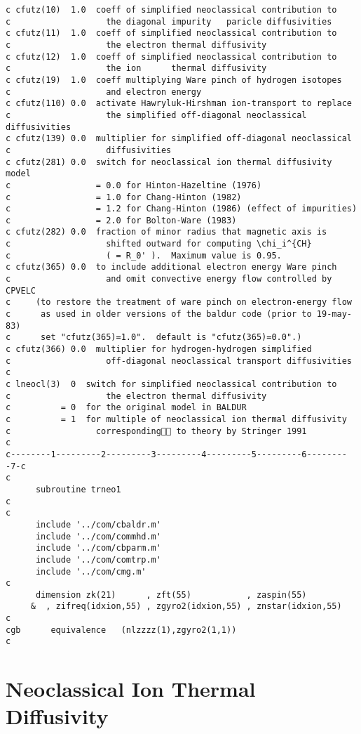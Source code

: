 \begin{verbatim}
c cfutz(10)  1.0  coeff of simplified neoclassical contribution to
c                   the diagonal impurity   paricle diffusivities
c cfutz(11)  1.0  coeff of simplified neoclassical contribution to
c                   the electron thermal diffusivity
c cfutz(12)  1.0  coeff of simplified neoclassical contribution to
c                   the ion      thermal diffusivity
c cfutz(19)  1.0  coeff multiplying Ware pinch of hydrogen isotopes
c                   and electron energy
c cfutz(110) 0.0  activate Hawryluk-Hirshman ion-transport to replace
c                   the simplified off-diagonal neoclassical diffusivities
c cfutz(139) 0.0  multiplier for simplified off-diagonal neoclassical 
c                   diffusivities
c cfutz(281) 0.0  switch for neoclassical ion thermal diffusivity model
c                 = 0.0 for Hinton-Hazeltine (1976)
c                 = 1.0 for Chang-Hinton (1982)
c                 = 1.2 for Chang-Hinton (1986) (effect of impurities)
c                 = 2.0 for Bolton-Ware (1983)
c cfutz(282) 0.0  fraction of minor radius that magnetic axis is 
c                   shifted outward for computing \chi_i^{CH}
c                   ( = R_0' ).  Maximum value is 0.95.
c cfutz(365) 0.0  to include additional electron energy Ware pinch
c                   and omit convective energy flow controlled by CPVELC
c     (to restore the treatment of ware pinch on electron-energy flow
c      as used in older versions of the baldur code (prior to 19-may-83)
c      set "cfutz(365)=1.0".  default is "cfutz(365)=0.0".)
c cfutz(366) 0.0  multiplier for hydrogen-hydrogen simplified
c                   off-diagonal neoclassical transport diffusivities
c
c lneocl(3)  0  switch for simplified neoclassical contribution to
c                   the electron thermal diffusivity
c          = 0  for the original model in BALDUR
c          = 1  for multiple of neoclassical ion thermal diffusivity
c                 corresponding to theory by Stringer 1991 
c
c--------1---------2---------3---------4---------5---------6---------7-c
c
      subroutine trneo1
c
c
      include '../com/cbaldr.m'
      include '../com/commhd.m'
      include '../com/cbparm.m'
      include '../com/comtrp.m'
      include '../com/cmg.m'
c
      dimension zk(21)      , zft(55)           , zaspin(55)
     &  , zifreq(idxion,55) , zgyro2(idxion,55) , znstar(idxion,55)
c
cgb      equivalence   (nlzzzz(1),zgyro2(1,1))
c
\end{verbatim}

\section{Neoclassical Ion Thermal Diffusivity}

